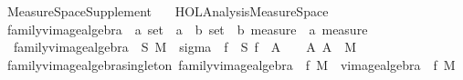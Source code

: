 %
\begin{isabellebody}%
%
%
\isadelimtheory
\isanewline
\isanewline
%
\endisadelimtheory
%
\isatagtheory
{}\isamarkupfalse%
\ Measure{\isacharunderscore}{\kern0pt}Space{\isacharunderscore}{\kern0pt}Supplement\isanewline
\ \ \ {\isachardoublequoteopen}HOL{\isacharminus}{\kern0pt}Analysis{\isachardot}{\kern0pt}Measure{\isacharunderscore}{\kern0pt}Space{\isachardoublequoteclose}\isanewline
{}%
\endisatagtheory
{\isafoldtheory}%
%
\isadelimtheory
%
\endisadelimtheory
%
\isadelimdocument
%
\endisadelimdocument
%
\isatagdocument
%
\isamarkuptrue%
%
\isamarkuptrue%
%
\endisatagdocument
{\isafolddocument}%
%
\isadelimdocument
%
\endisadelimdocument
{}\isamarkupfalse%
\ family{\isacharunderscore}{\kern0pt}vimage{\isacharunderscore}{\kern0pt}algebra\ {\isacharcolon}{\kern0pt}{\isacharcolon}{\kern0pt}\ {\isachardoublequoteopen}{\isacharprime}{\kern0pt}a\ set\ {\isasymRightarrow}\ {\isacharparenleft}{\kern0pt}{\isacharprime}{\kern0pt}a\ {\isasymRightarrow}\ {\isacharprime}{\kern0pt}b{\isacharparenright}{\kern0pt}\ set\ {\isasymRightarrow}\ {\isacharprime}{\kern0pt}b\ measure\ {\isasymRightarrow}\ {\isacharprime}{\kern0pt}a\ measure{\isachardoublequoteclose}\ \isanewline
\ \ {\isachardoublequoteopen}family{\isacharunderscore}{\kern0pt}vimage{\isacharunderscore}{\kern0pt}algebra\ {\isasymOmega}\ S\ M\ {\isasymequiv}\ sigma\ {\isasymOmega}\ {\isacharparenleft}{\kern0pt}{\isasymUnion}f\ {\isasymin}\ S{\isachardot}{\kern0pt}\ {\isacharbraceleft}{\kern0pt}f\ {\isacharminus}{\kern0pt}{\isacharbackquote}{\kern0pt}\ A\ {\isasyminter}\ {\isasymOmega}\ {\isacharbar}{\kern0pt}\ A{\isachardot}{\kern0pt}\ A\ {\isasymin}\ M{\isacharbraceright}{\kern0pt}{\isacharparenright}{\kern0pt}{\isachardoublequoteclose}\isanewline
\isanewline
{}\isamarkupfalse%
\ family{\isacharunderscore}{\kern0pt}vimage{\isacharunderscore}{\kern0pt}algebra{\isacharunderscore}{\kern0pt}singleton{\isacharcolon}{\kern0pt}\ {\isachardoublequoteopen}family{\isacharunderscore}{\kern0pt}vimage{\isacharunderscore}{\kern0pt}algebra\ {\isasymOmega}\ {\isacharbraceleft}{\kern0pt}f{\isacharbraceright}{\kern0pt}\ M\ {\isacharequal}{\kern0pt}\ vimage{\isacharunderscore}{\kern0pt}algebra\ {\isasymOmega}\ f\ M{\isachardoublequoteclose}%
\isadelimproof

\end{isabellebody}

